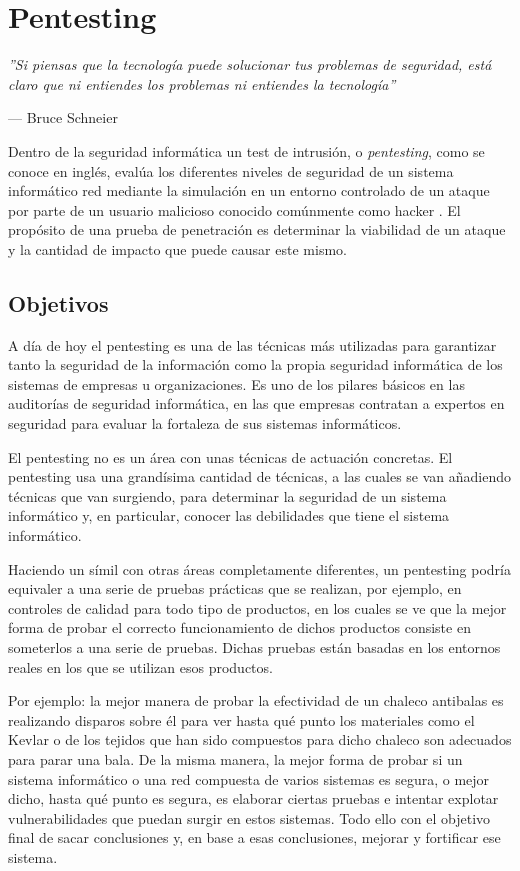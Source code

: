 \chapter{Pentesting}

\epigraph{\textit{''Si piensas que la tecnología puede solucionar tus problemas de seguridad, está claro que ni entiendes los problemas ni entiendes la tecnología''}}{--- Bruce Schneier}

Dentro de la seguridad informática un test de intrusión, o \textit{pentesting}, como se conoce en inglés, evalúa los diferentes niveles de seguridad de un sistema informático red mediante la simulación en un entorno controlado de un ataque por parte de un usuario malicioso conocido comúnmente como hacker \cite{pentesting-kali}. El propósito de una prueba de penetración es determinar la viabilidad de un ataque y la cantidad de impacto que puede causar este mismo.

\section{Objetivos}

A día de hoy el pentesting es una de las técnicas más utilizadas para garantizar tanto la seguridad de la información como la propia seguridad informática de los sistemas de empresas u organizaciones. Es uno de los pilares básicos en las auditorías de seguridad informática, en las que empresas contratan a expertos en seguridad para evaluar la fortaleza de sus sistemas informáticos.

El pentesting no es un área con unas técnicas de actuación concretas. El pentesting usa una grandísima cantidad de técnicas, a las cuales se van añadiendo técnicas que van surgiendo, para determinar la seguridad de un sistema informático y, en particular, conocer las debilidades que tiene el sistema informático.

Haciendo un símil con otras áreas completamente diferentes, un pentesting podría equivaler a una serie de pruebas prácticas que se realizan, por ejemplo, en controles de calidad para todo tipo de productos, en los cuales se ve que la mejor forma de probar el correcto funcionamiento de dichos productos consiste en someterlos a una serie de pruebas. Dichas pruebas están basadas en los entornos reales en los que se utilizan esos productos.

Por ejemplo: la mejor manera de probar la efectividad de un chaleco antibalas es realizando disparos sobre él para ver hasta qué punto los materiales como el Kevlar o de los tejidos que han sido compuestos para dicho chaleco son adecuados para parar una bala. De la misma manera, la mejor forma de probar si un sistema informático o una red compuesta de varios sistemas es segura, o mejor dicho, hasta qué punto es segura, es elaborar ciertas pruebas e intentar explotar vulnerabilidades que puedan surgir en estos sistemas. Todo ello con el objetivo final de sacar conclusiones y, en base a esas conclusiones, mejorar y fortificar ese sistema.

